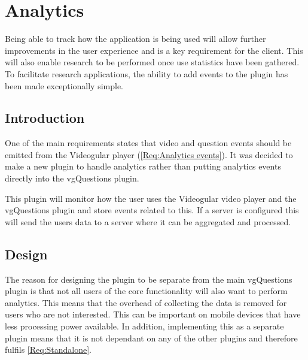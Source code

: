 
\chapter{Analytics} \label{Chapter: Analytics}

\begin{preamble}
	Being able to track how the application is being used will allow further improvements in the user experience and is a key requirement for the client. This will also enable research to be performed once use statistics have been gathered. To facilitate research applications, the ability to add events to the plugin has been made exceptionally simple.
\end{preamble}

\section{Introduction}

One of the main requirements states  that video and question events should be emitted from the Videogular player (\cref{Req:Analytics events}). It was decided to make a new plugin to handle analytics rather than putting analytics events directly into the \gls{vgQuestions} plugin.

This plugin will monitor how the user uses the \gls{Videogular} video player and the \gls{vgQuestions} plugin and store events related to this. If a server is configured this will send the users data to a server where it can be aggregated and processed.

\section{Design}

The reason for designing the plugin to be separate from the main \gls{vgQuestions} plugin is that not all users of the core functionality will also want to perform analytics. This means that the overhead of collecting the data is removed for users who are not interested. This can be important on mobile devices that have less processing power available. In addition, implementing this as a separate plugin means that it is not dependant on any of the other plugins and therefore fulfils \cref{Req:Standalone}.

